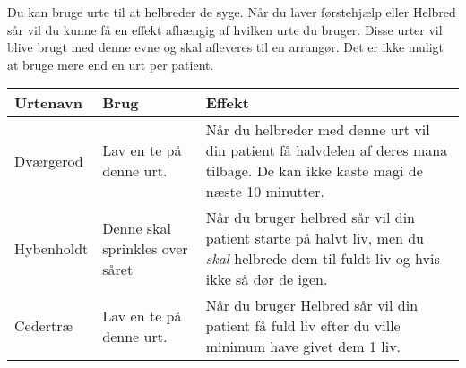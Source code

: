 Du kan bruge urte til at helbreder de syge. Når du laver førstehjælp eller Helbred sår vil du kunne få en effekt afhængig af hvilken urte du bruger. Disse urter vil blive brugt med denne evne og skal afleveres til en arrangør. Det er ikke muligt at bruge mere end en urt per patient.
\begin{table}[H]
     \centering
    \begin{tabular}{|p{}|p{}|p{}|}
    \rowcolor{cerulean!80}\hline
        Urtenavn & Brug & Effekt \\\hline
        Dværgerod & Lav en te på denne urt. & Når du helbreder med denne urt vil din patient få halvdelen af deres mana tilbage. De kan ikke kaste magi de næste 10 minutter.\\\hline
        Hybenholdt &Denne skal sprinkles over såret& Når du bruger helbred sår vil din patient starte på halvt liv, men du \emph{skal} helbrede dem til fuldt liv og hvis ikke så dør de igen.\\\hline
        Cedertræ &Lav en te på denne urt.& Når du bruger Helbred sår vil din patient få fuld liv efter du ville minimum have givet dem 1 liv.\\\hline
    \end{tabular}
\end{table}

 